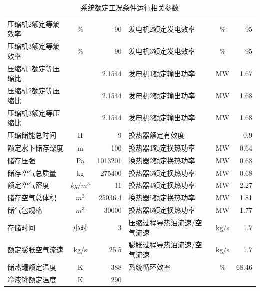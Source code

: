 \documentclass{jnuthesis}
\begin{document}
\begin{table}[]
{\begin{tabular}{l|c|r|l|c|r}
				压缩机2额定等熵效率              & \%                      & 90                         &发电机2额定发电效率              & \%                      & 95\\
				压缩机3额定等熵效率              & \%                      & 90                          &发电机3额定发电效率              & \%                      & 95\\
				压缩机1额定等压缩比              &                         & 2.1544                     &发电机1额定输出功率              & MW                      & 1.67 \\
				压缩机2额定等压缩比              &                         & 2.1544                      &发电机2额定输出功率              & MW                      & 1.68\\
				压缩机3额定等压缩比              &                         & 2.1544                      &发电机3额定输出功率              & MW                      & 1.68\\
				压缩储能总时间                 & H                       & 9                         &换热器额定有效度                &                         & 0.9  \\
				额定水下储存深度                & m                       & 100                        &换热器1额定换热功率              & MW                      & 0.64  \\
				储存压强                    & Pa                      & 1013201                    &换热器2额定换热功率              & MW                      & 0.68 \\
				储存空气总质量                 & kg                      & 275400                      &换热器3额定换热功率              & MW                      & 0.68\\
				额定空气密度                  & $ kg/m^3 $ & 11                         &换热器4额定换热功率              & MW                      & 2.27 \\
				储存空气总体积                 & $ m^3  $   & 25036.4                    &换热器5额定换热功率              & MW                      & 1.81 \\
				储气包规格                   & $ m^3 $    & 30000                      &换热器6额定换热功率              & MW                      & 1.77  \\
				存储时间                    & 小时                      & 3                          &压缩过程导热油流速/空气流速          & kg/s                    & 1.7  \\
				额定膨胀空气流速                & kg/s                    & 25.5                        &膨胀过程导热油流速/空气流速          & kg/s                    & 1.7  \\
				储热罐额定温度                 & K                       & 388                         &系统循环效率                  & \%                      & 68.46\\
				冷液罐额定温度                 & K                       & 290                         
				
			\end{tabular}
		}
		\caption{\fontsize{10.5bp}{10pt}系统额定工况条件运行相关参数}
		\label{tab:my-table}
	\end{table}
	
\end{document}
